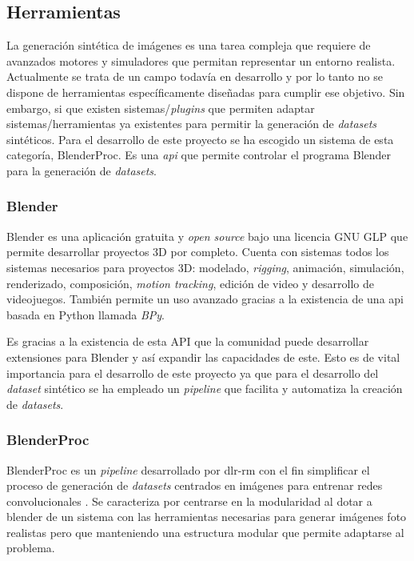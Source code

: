 \subsection{Herramientas}
La generación sintética de imágenes es una tarea compleja que requiere de avanzados motores y simuladores que permitan representar un entorno realista. Actualmente se trata de un campo todavía en desarrollo y por lo tanto no se dispone de herramientas específicamente diseñadas para cumplir ese objetivo. Sin embargo, si que existen sistemas/\textit{plugins} que permiten adaptar sistemas/herramientas ya existentes para permitir la generación de \textit{datasets} sintéticos. Para el desarrollo de este proyecto se ha escogido un sistema de esta categoría, BlenderProc. Es una \textit{\ac{api}} que permite controlar el programa Blender para la generación de \textit{datasets}.

\subsubsection*{Blender}
\label{chap:Generación de un dataset subsec:Blender}
Blender es una aplicación gratuita y \textit{open source} bajo una licencia GNU GLP que permite desarrollar proyectos 3D por completo. Cuenta con sistemas todos los sistemas necesarios para proyectos 3D: modelado, \textit{rigging}, animación, simulación, renderizado, composición, \textit{motion tracking}, edición de video y desarrollo de videojuegos. También permite un uso avanzado gracias a la existencia de una \acs{api} basada en Python llamada \textit{BPy}.

Es gracias a la existencia de esta API que la comunidad puede desarrollar extensiones para Blender y así expandir las capacidades de este. Esto es de vital importancia para el desarrollo de este proyecto ya que para el desarrollo del \textit{dataset} sintético se ha empleado un \textit{pipeline} que facilita y automatiza la creación de \textit{datasets}. 

\subsubsection*{BlenderProc}
\label{chap:Generación de un dataset subsec:BlenderProc}
BlenderProc es un \textit{pipeline} desarrollado por \ac{dlr-rm} con el fin simplificar el proceso de generación de \textit{datasets} centrados en imágenes para entrenar redes convolucionales \citep{denninger2019blenderproc}. Se caracteriza por centrarse en la modularidad al dotar a blender de un sistema con las herramientas necesarias para generar imágenes foto realistas pero que manteniendo una estructura modular que permite adaptarse al problema.

